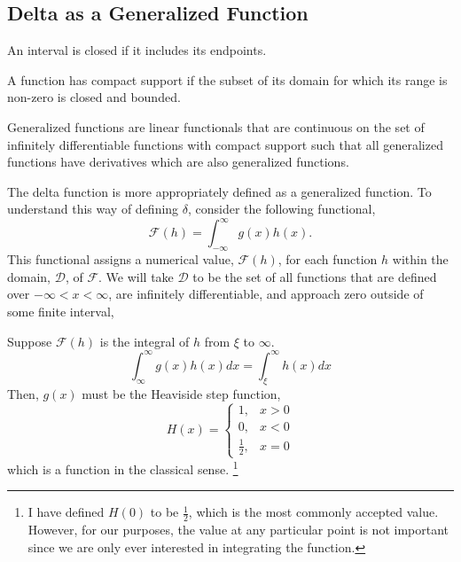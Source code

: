 \subsection{Delta as a Generalized Function}
\begin{definition}
    An interval is closed if it includes its endpoints.
\end{definition}
\begin{definition}
    A function has compact support if the subset of its domain for which its range is non-zero is closed and bounded.
\end{definition}

\begin{definition}
    Generalized functions are linear functionals that are continuous on the set of infinitely differentiable functions with compact support such that all generalized functions have derivatives which are also generalized functions.
\end{definition}

The delta function is more appropriately defined as a generalized function. To understand this way of defining \(\delta\), consider the following functional,
\begin{equation}
    \mathcal{F}(h) = \int_{-\infty}^{\infty} g(x)h(x).
\end{equation}
This functional assigns a numerical value, \(\mathcal{F}(h)\), for each function \(h\) within the domain, \(\mathcal{D}\), of \(\mathcal{F}\). We will take \(\mathcal{D}\) to be the set of all functions that are defined over \(-\infty <x<\infty\), are infinitely differentiable, and approach zero outside of some finite interval,

Suppose \(\mathcal{F}(h)\) is the integral of \(h\) from \(\xi\) to \(\infty\).
\begin{equation}
    \int_{\infty}^{\infty} g(x)h(x)dx = \int_{\xi}^{\infty} h(x) dx
\end{equation}
Then, \(g(x)\) must be the Heaviside step function,
\begin{equation}
    H(x) = \begin{cases}
        1, & x>0\\
        0, & x<0\\
        \frac{1}{2}, & x=0
    \end{cases}
\end{equation}
which is a function in the classical sense. \footnote{I have defined \(H(0)\) to be \(\frac{1}{2}\), which is the most commonly accepted value. However, for our purposes, the value at any particular point is not important since we are only ever interested in integrating the function.}

